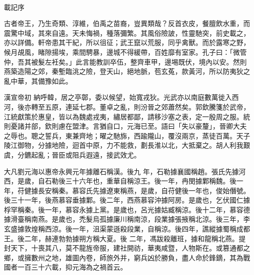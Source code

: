 \begin{pinyinscope}
 



 載記序



 古者帝王，乃生奇類、淳維，伯禹之苗裔，豈異類哉？反首衣皮，餐膻飲水重，而震驚中域，其來自遠。天未悔禍，種落彌繁。其風俗險詖，性靈馳突，前史載之，亦以詳備。軒帝患其干紀，所以徂征；武王竄以荒服，同乎禽獸。而於露寒之野，候月覘風，睹隙揚埃，乘間騁暴，邊城不得緩帶，百姓靡有室家。孔子曰：「微管仲，吾其被髮左衽矣。」此言能教訓卒伍，整齊車甲，邊埸既伏，境內以安。然則燕築造陽之郊，秦塹臨洮之險，登天山，絕地脈，苞玄菟，款黃河，所以防夷狄之亂中華，其備豫如此。



 漢宣帝初
 納呼韓，居之亭鄣，委以候望，始寬戎狄。光武亦以南庭數萬徙入西河，後亦轉至五原，連延七郡。董卓之亂，則汾晉之郊蕭然矣。郭欽騰箋於武帝，江統獻策於惠皇，皆以為魏處戎夷，繡居都鄙，請移沙塞之表，定一殷周之服。統則憂諸并部，欽則慮在盟津。言猶自口，元海已至。語曰「失以豪釐」，晉卿大夫之辱也。聰之誓兵，東兼齊地；曜之馳旆，西踰隴山，覆沒兩京，蒸徒百萬。天子陵江御物，分據地險，迴首中原，力不能救，劃長淮以北，大抵棄之。胡人利我艱虞，分鑣起亂；晉臣或阻兵遐遠，接武效尤。



 大凡劉元海以惠帝永興元年據離石稱漢。後九
 年，石勒據襄國稱趙。張氏先據河西，是歲，自石勒後三十六年也，重華自稱涼王。後一年，冉閔據鄴稱魏。後一年，苻健據長安稱秦。慕容氏先據遼東稱燕，是歲，自苻健後一年也，俊始僭號。後三十一年，後燕慕容垂據鄴。後二年，西燕慕容沖據阿房。是歲也，乞伏國仁據桴罕稱秦。後一年，慕容永據上黨。是歲也，呂光據姑臧稱涼。後十二年，慕容德據滑臺稱南燕。是歲也，禿髮烏孤據廉川稱南涼，段業據張掖稱北涼。後三年，李玄盛據敦煌稱西涼。後一年，沮渠蒙遜殺段業，自稱涼。後四年，譙縱據蜀稱成都王。後二年，赫連勃勃據朔方稱大夏。後
 二年，馮跋殺離班，據和龍稱北燕。提封天下，十喪其八，莫不龍旌帝服，建社開祊，華夷咸暨，人物斯在。或篡通都之鄉，或擁數州之地，雄圖內卷，師旅外并，窮兵凶於勝負，盡人命於鋒鏑，其為戰國者一百三十六載，抑元海為之禍首云。



\end{pinyinscope}